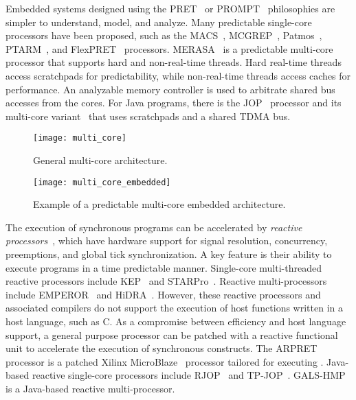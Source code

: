 Embedded systems designed using the PRET~\cite{pret_repeatable_timing} or PROMPT~\cite{KastnerSPCGHF12}
philosophies are simpler to understand, model, and analyze.
Many predictable single-core processors have been proposed,
such as the %
MACS~\cite{pret_macs}, 
MCGREP~\cite{pret_mcgrep}, Patmos~\cite{pret_patmos}, %
PTARM~\cite{LiuRBZL12}, and FlexPRET~\cite{ZimmerBSL14} processors.
MERASA~\cite{pret_merasa} is a 
predictable multi-core processor that supports hard and non-real-time
threads. Hard real-time threads access scratchpads for predictability, 
while non-real-time threads access caches for performance. An analyzable
memory controller is used to arbitrate shared bus accesses from the cores.
For Java programs, there is the %
JOP~\cite{pret_java_architecture} processor and its multi-core 
variant~\cite{pret_jop_cmp_scalability} that uses scratchpads and 
a shared TDMA bus.

\begin{figure}
	\centering
	
	\begin{minipage}[t]{0.45\columnwidth}
		\texttt{[image: multi\_core]}
		\caption{General multi-core architecture.}
		\label{fig:introduction:multi_core}
	\end{minipage}
	\hfill
	\begin{minipage}[t]{0.45\columnwidth}
		\texttt{[image: multi\_core\_embedded]}
		\caption{Example of a predictable multi-core embedded architecture.}
		\label{fig:introduction:multi_core_embedded}
	\end{minipage}
\end{figure}

The execution of synchronous programs can be accelerated by
\emph{reactive processors}~\cite{SalcicBB02,LiH12}, which
have hardware support for signal resolution, concurrency,
preemptions, and global tick synchronization. A key feature
is their ability to execute programs in a time predictable
manner. Single-core multi-threaded reactive processors
include %
KEP~\cite{LiH12} and %
STARPro~\cite{YuanAYRS09}.
Reactive multi-processors include %
EMPEROR~\cite{DayaratneRS06} and %
HiDRA~\cite{SalcicHRB06}. However, these
reactive processors and associated compilers do not support
the execution of host functions written in a host language,
such as C. As a compromise between efficiency and host 
language support, a general purpose processor can be
patched with a reactive functional unit to accelerate the
execution of synchronous constructs. The %
ARPRET~\cite{AndalamRG10} processor is a
patched Xilinx MicroBlaze~\cite{microblaze} processor tailored for executing \pretc{}. 
Java-based reactive single-core processors include %
RJOP~\cite{NadeemBS11} and %
TP-JOP~\cite{LiMS14}.  %
GALS-HMP~\cite{SalcicM13} is a Java-based reactive multi-processor.

